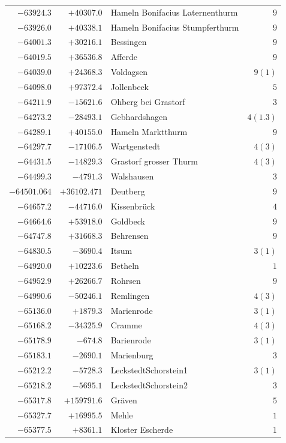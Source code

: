 \begin{center}
\begin{tabular}{r|r|p{170pt}|r}
\(-63924.3\)&\(+40307.0\)&Hameln Bonifacius Laternenthurm&\(9\)\\
\(-63926.0\)&\(+40338.1\)&Hameln Bonifacius Stumpferthurm&\(9\)\\
\(-64001.3\)&\(+30216.1\)&Bessingen&\(9\)\\
\(-64019.5\)&\(+36536.8\)&Afferde&\(9\)\\
\(-64039.0\)&\(+24368.3\)&Voldagsen&\(9 (1)\)\\
\(-64098.0\)&\(+97372.4\)&Jollenbeck&\(5\)\\
\(-64211.9\)&\(-15621.6\)&Ohberg bei Grastorf&\(3\)\\
\(-64273.2\)&\(-28493.1\)&Gebhardshagen&\(4(1.3)\)\\
\(-64289.1\)&\(+40155.0\)&Hameln Marktthurm&\(9\)\\
\(-64297.7\)&\(-17106.5\)&Wartgenstedt&\(4 (3)\)\\
\(-64431.5\)&\(-14829.3\)&Grastorf grosser Thurm&\(4 (3)\)\\
\(-64499.3\)&\(-4791.3\)&Walshausen&\(3\)\\
\(-64501.064\)&\(+36102.471\)&Deutberg&\(9\)\\
\(-64657.2\)&\(-44716.0\)&Kissenbrück&\(4\)\\
\(-64664.6\)&\(+53918.0\)&Goldbeck&\(9\)\\
\(-64747.8\)&\(+31668.3\)&Behrensen&\(9\)\\
\(-64830.5\)&\(-3690.4\)&Itsum&\(3 (1)\)\\
\(-64920.0\)&\(+10223.6\)&Betheln&\(1\)\\
\(-64952.9\)&\(+26266.7\)&Rohrsen&\(9\)\\
\(-64990.6\)&\(-50246.1\)&Remlingen&\(4 (3)\)\\
\(-65136.0\)&\(+1879.3\)&Marienrode&\(3 (1)\)\\
\(-65168.2\)&\(-34325.9\)&Cramme&\(4 (3)\)\\
\(-65178.9\)&\(-674.8\)&Barienrode&\(3 (1)\)\\
\(-65183.1\)&\(-2690.1\)&Marienburg&\(3\)\\
\(-65212.2\)&\(-5728.3\)&LeckstedtSchorstein1&\(3 (1)\)\\
\(-65218.2\)&\(-5695.1\)&LeckstedtSchorstein2&\(3\)\\
\(-65317.8\)&\(+159791.6\)&Gräven&\(5\)\\
\(-65327.7\)&\(+16995.5\)&Mehle&\(1\)\\
\(-65377.5\)&\(+8361.1\)&Kloster Escherde&\(1\)\\
\hline\end{tabular}\endgroup\end{center}
